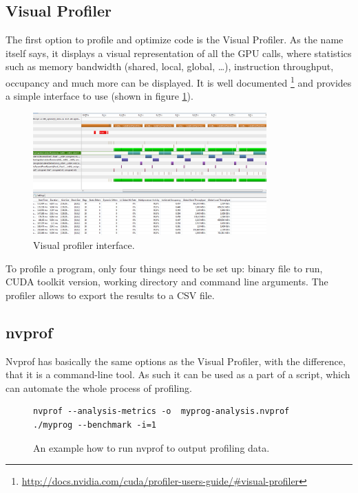 \subsection{Visual Profiler}\label{subsec:proftools-visual-profiler}

The first option to profile and optimize code is the Visual Profiler. As the name itself says, it displays a visual representation of all the GPU calls, where statistics such as memory bandwidth (shared, local, global, \dots), instruction throughput, occupancy and much more can be displayed. It is well documented \footnote{\url{http://docs.nvidia.com/cuda/profiler-users-guide/\#visual-profiler}} and provides a simple interface to use (shown in figure \ref{fig:visual-profiler}). 

\begin{figure}[ht]
	\begin{center}
	\includegraphics[width=0.8\textwidth]{fig/visual_profiler.jpg}
	\caption{Visual profiler interface.}
	\label{fig:visual-profiler}
	\end{center}
\end{figure}


To profile a program, only four things need to be set up: binary file to run, CUDA toolkit version, working directory and command line arguments. The profiler allows to export the results to a CSV file.

\subsection{nvprof}\label{subsec:proftools-nvprof}

Nvprof has basically the same options as the Visual Profiler, with the difference, that it is a command-line tool. As such it can be used as a part of a script, which can automate the whole process of profiling.

\begin{figure}
\begin{verbatim}
nvprof --analysis-metrics -o  myprog-analysis.nvprof ./myprog --benchmark -i=1
\end{verbatim}
\caption{An example how to run nvprof to output profiling data.}
\end{figure}


